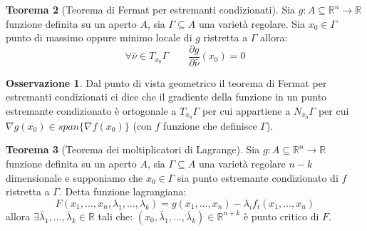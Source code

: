\documentclass[leqno]{article}
\theoremstyle{definition}
\numberwithin{equation}{section}
\newtheorem{theorem}{Teorema}[section]
\newtheorem{observation}[theorem]{Osservazione}
\theoremstyle{remark}
\begin{document}
	\begin{theorem}[Teorema di Fermat per estremanti condizionati]
		Sia $g:A\subseteq \mathbb{R}^n \rightarrow \mathbb{R}$ funzione definita su un aperto $A$, sia $\Gamma \subseteq A$ una varietà regolare. Sia $x_0 \in \Gamma$ punto di massimo oppure minimo locale di $g$ ristretta a $\Gamma$ allora: 
		\begin{equation}
			\forall \hat{\nu}\in T_{x_0}\Gamma \quad \quad \dfrac{\partial g}{\partial \hat{\nu}}(x_0)=0
		\end{equation}
		\begin{observation}
			Dal punto di vista geometrico il teorema di Fermat per estremanti condizionati ci dice che il gradiente della funzione in un punto estremante condizionato è ortogonale a $T_{x_0}\Gamma$ per cui appartiene a $N_{x_0}\Gamma$ per cui $\nabla g(x_0)\in span \{ \nabla f(x_0) \}$ (con $f$ funzione che definisce $\Gamma$).
		\end{observation}
	\end{theorem}
	\begin{theorem}[Teorema dei moltiplicatori di Lagrange]
		Sia $g:A\subseteq \mathbb{R}^n \rightarrow \mathbb{R}$ funzione definita su un aperto $A$, sia $\Gamma \subseteq A$ una varietà regolare $n-k$ dimensionale e supponiamo che $x_0\in \Gamma$ sia punto estremante condizionato di $f$ ristretta a $\Gamma$. Detta funzione lagrangiana:
		\begin{equation}
			F(x_1,\dots,x_n,\lambda_1,\dots,\lambda_k)=g(x_1,\dots,x_n)-\lambda_i f_i(x_1,\dots,x_n)
		\end{equation}
		allora $\exists\overline{\lambda}_1,\dots,\overline{\lambda}_k \in \mathbb{R}$ tali che: $(x_0,\overline{\lambda}_1,\dots,\overline{\lambda}_k) \in \mathbb{R}^{n+k}$ è punto critico di $F$.
	\end{theorem}
\end{document}
